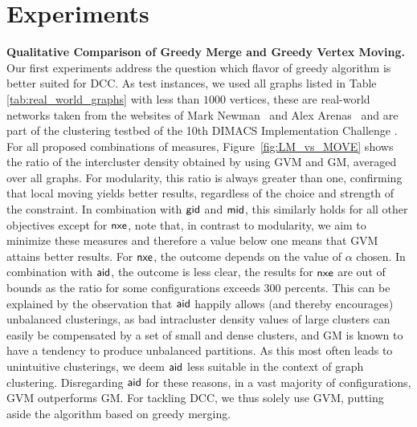 \documentclass{llncs}
\newcommand{\measure}[1]{\ensuremath{\text{\normalfont{\sffamily {#1}}}}\xspace}
\newcommand{\andreapar}{\vspace*{.5ex}\par\noindent}
\begin{document}
\section{Experiments}
\andreapar\textbf{Qualitative Comparison of Greedy Merge and Greedy Vertex Moving.}
Our first experiments address the question which flavor of greedy algorithm is better suited for \textsc{DCC}.
As test instances, we used all graphs listed in Table \ref{tab:real_world_graphs} with less than $1000$ vertices, these are real-world networks taken from the websites of Mark Newman~\cite{newmanWS}
and Alex Arenas~\cite{arenasWS} and are part of the clustering testbed of the 10th DIMACS Implementation Challenge \cite{dimacsWS}.
For all proposed combinations of measures,
Figure~\ref{fig:LM_vs_MOVE} shows the ratio of the intercluster density obtained by using GVM and GM, averaged over all graphs.
For modularity, this ratio is always greater than one, confirming that local moving yields better results, regardless of the choice and strength of the constraint.
In combination with \measure{gid} and \measure{mid}, this similarly holds for all other objectives except for \measure{nxe}, note that, in contrast to modularity, we aim to minimize these measures and therefore a value below one means that GVM attains better results.
For \measure{nxe}, the outcome depends on the value of $\alpha$ chosen.
In combination with \measure{aid}, the outcome is less clear, the results for \measure{nxe} are out of bounds as the ratio for some configurations exceeds 300 percents.
This can be explained by the observation that \measure{aid} happily allows (and thereby encourages) unbalanced clusterings, as bad intracluster density values of large clusters can easily be compensated by a set of small and dense clusters, and GM is known to have a tendency to produce unbalanced partitions.
As this most often leads to unintuitive clusterings, we deem \measure{aid} less suitable in the context of graph clustering.
Disregarding \measure{aid} for these reasons, in a vast majority of configurations, GVM outperforms GM. 
For tackling \textsc{DCC}, we thus solely use GVM, putting aside the algorithm based on greedy merging.
\par
\end{document}

